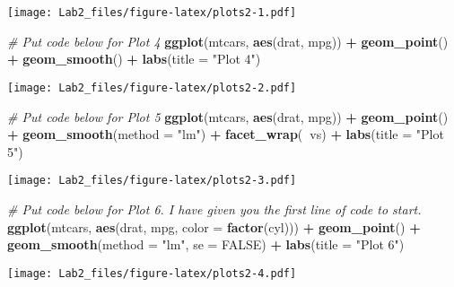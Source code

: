 \documentclass[
]{article}
\newenvironment{Shaded}{\begin{snugshade}}{\end{snugshade}}
\newcommand{\CommentTok}[1]{\textcolor[rgb]{0.56,0.35,0.01}{\textit{#1}}}
\newcommand{\DataTypeTok}[1]{\textcolor[rgb]{0.13,0.29,0.53}{#1}}
\newcommand{\KeywordTok}[1]{\textcolor[rgb]{0.13,0.29,0.53}{\textbf{#1}}}
\newcommand{\NormalTok}[1]{#1}
\newcommand{\OperatorTok}[1]{\textcolor[rgb]{0.81,0.36,0.00}{\textbf{#1}}}
\newcommand{\OtherTok}[1]{\textcolor[rgb]{0.56,0.35,0.01}{#1}}
\newcommand{\StringTok}[1]{\textcolor[rgb]{0.31,0.60,0.02}{#1}}
\begin{document}
\texttt{[image: Lab2\_files/figure-latex/plots2-1.pdf]}

\begin{Shaded}
\begin{Highlighting}[]
\CommentTok{# Put code below for Plot 4}
\KeywordTok{ggplot}\NormalTok{(mtcars, }\KeywordTok{aes}\NormalTok{(drat, mpg)) }\OperatorTok{+}
\StringTok{  }\KeywordTok{geom_point}\NormalTok{() }\OperatorTok{+}
\StringTok{  }\KeywordTok{geom_smooth}\NormalTok{() }\OperatorTok{+}
\StringTok{  }\KeywordTok{labs}\NormalTok{(}\DataTypeTok{title =} \StringTok{"Plot 4"}\NormalTok{)}
\end{Highlighting}
\end{Shaded}

\texttt{[image: Lab2\_files/figure-latex/plots2-2.pdf]}

\begin{Shaded}
\begin{Highlighting}[]
\CommentTok{# Put code below for Plot 5}
\KeywordTok{ggplot}\NormalTok{(mtcars, }\KeywordTok{aes}\NormalTok{(drat, mpg)) }\OperatorTok{+}
\StringTok{  }\KeywordTok{geom_point}\NormalTok{() }\OperatorTok{+}
\StringTok{  }\KeywordTok{geom_smooth}\NormalTok{(}\DataTypeTok{method =} \StringTok{"lm"}\NormalTok{) }\OperatorTok{+}
\StringTok{  }\KeywordTok{facet_wrap}\NormalTok{(}\OperatorTok{~}\NormalTok{vs) }\OperatorTok{+}
\StringTok{  }\KeywordTok{labs}\NormalTok{(}\DataTypeTok{title =} \StringTok{"Plot 5"}\NormalTok{)}
\end{Highlighting}
\end{Shaded}

\texttt{[image: Lab2\_files/figure-latex/plots2-3.pdf]}

\begin{Shaded}
\begin{Highlighting}[]
\CommentTok{# Put code below for Plot 6. I have given you the first line of code to start.}
\KeywordTok{ggplot}\NormalTok{(mtcars, }\KeywordTok{aes}\NormalTok{(drat, mpg, }\DataTypeTok{color =} \KeywordTok{factor}\NormalTok{(cyl))) }\OperatorTok{+}
\StringTok{  }\KeywordTok{geom_point}\NormalTok{() }\OperatorTok{+}
\StringTok{  }\KeywordTok{geom_smooth}\NormalTok{(}\DataTypeTok{method =} \StringTok{"lm"}\NormalTok{, }\DataTypeTok{se =} \OtherTok{FALSE}\NormalTok{) }\OperatorTok{+}
\StringTok{  }\KeywordTok{labs}\NormalTok{(}\DataTypeTok{title =} \StringTok{"Plot 6"}\NormalTok{)}
\end{Highlighting}
\end{Shaded}

\texttt{[image: Lab2\_files/figure-latex/plots2-4.pdf]}
\end{document}
